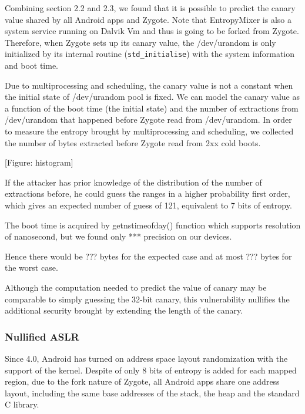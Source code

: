 Combining section 2.2 and 2.3, we found that it is possible to predict the canary value shared by all Android apps and Zygote. Note that EntropyMixer is also a system service running on Dalvik Vm and thus is going to be forked from Zygote. Therefore, when Zygote sets up its canary value, the /dev/urandom is only initialized by its internal routine (\verb|std_initialise|)  with the system information and boot time.

Due to multiprocessing and scheduling, the canary value is not a constant when the initial state of /dev/urandom pool is fixed.  We can model the canary value as a function of the boot time (the initial state) and the number of extractions from /dev/urandom that happened before Zygote read from /dev/urandom. In order to measure the entropy brought by multiprocessing and scheduling, we collected the number of bytes extracted before Zygote read from 2xx cold boots.

[Figure: histogram] 

If the attacker has prior knowledge of the distribution of the number of extractions before, he could guess the ranges in a higher probability first order, which gives an expected number of guess of 121, equivalent to 7 bits of entropy.

The boot time is acquired by getnstimeofday() function which supports resolution of nanosecond, but we found only *** precision on our devices. 

Hence there would be ??? bytes for the expected case and at most ??? bytes for the worst case.

Although the computation needed to predict the value of canary may be comparable to simply guessing the 32-bit canary, this vulnerability nullifies the additional security brought by extending the length of the canary.

\subsubsection{Nullified ASLR}

Since 4.0, Android has turned on address space layout randomization with the support of the kernel. Despite of only 8 bits of entropy is added for each mapped region, due to the fork nature of Zygote, all Android apps share one address layout, including the same base addresses of the stack, the heap and the standard C library.

